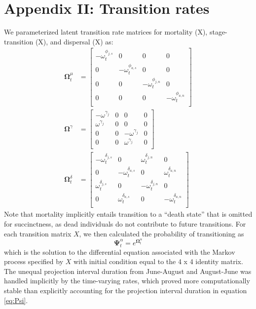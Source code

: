 \documentclass[11pt]{article}
\begin{document}
\section*{Appendix II: Transition rates}

We parameterized latent transition rate matrices for mortality (X),
stage-transition (X),
and dispersal (X) as:
\begin{equation} \label{eq:Theta}
\begin{aligned}
\boldsymbol\Omega^{\mu}_t & =
\left[
\begin{array}{cc|cc}
    -\omega^{\phi_{j,s}}_t & 0 & 0 & 0 \\
    0 & -\omega^{\phi_{a,s}}_t & 0 & 0 \\
    \hline
    0 & 0 & -\omega^{\phi_{j,n}}_t & 0 \\
    0 & 0 & 0 & -\omega^{\phi_{a,n}}_t \\
    \end{array}
\right] \\
\boldsymbol\Omega^{\gamma} & =
\left[
\begin{array}{cc|cc}
    -\omega^{\gamma_{j}} & 0 & 0 & 0 \\
    \omega^{\gamma_{j}}  & 0 & 0 & 0 \\
    \hline
    0 & 0 & -\omega^{\gamma_{j}} & 0 \\
    0 & 0 & \omega^{\gamma_{j}}  & 0 \\
    \end{array}
\right] \\
\boldsymbol\Omega^{\delta}_t & =
\left[
\begin{array}{cc|cc}
    -\omega^{\delta_{j,s}}_t & 0 & \omega^{\delta_{j,n}}_t & 0 \\
    0 & -\omega^{\delta_{a,s}}_t & 0 & \omega^{\delta_{a,n}}_t \\
    \hline
    \omega^{\delta_{j,s}}_t & 0 & -\omega^{\delta_{j,n}}_t & 0 \\
    0 & \omega^{\delta_{a,s}}_t & 0 & -\omega^{\delta_{a,n}}_t \\
    \end{array}
\right]
\end{aligned}
\end{equation}
%
Note that mortality implicitly entails transition to a ``death state'' that is omitted
for succinctness, as dead individuals do not contribute to future transitions.
For each transition matrix $X$,
we then calculated the probability of transitioning as
%
\begin{equation} \label{eq:Psi}
\boldsymbol\Psi^{\alpha}_t = e^{\boldsymbol\Omega^{\alpha}_t}
\end{equation}
%
which is the solution to the differential equation associated with the Markov process
specified by $X$
with initial condition equal to the 4 x 4 identity matrix.
The unequal projection interval duration from June-August and August-June was handled
implicitly by the time-varying rates,
which proved more computationally stable than explicitly accounting for the projection
interval duration in equation \ref{eq:Psi}.
\end{document}
